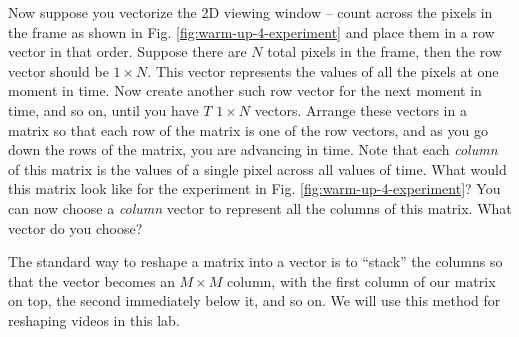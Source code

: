 Now suppose you vectorize the 2D viewing window -- count across the pixels in the frame as shown in Fig. \ref{fig:warm-up-4-experiment} and place them in a row vector in that order. Suppose there are $N$ total pixels in the frame, then the row vector should be $1 \times N$. This vector represents the values of all the pixels at one moment in time. Now create another such row vector for the next moment in time, and so on, until you have $T$ $1 \times N$ vectors. Arrange these vectors in a matrix so that each row of the matrix is one of the row vectors, and as you go down the rows of the matrix, you are advancing in time. Note that each \textit{column} of this matrix is the values of a single pixel across all values of time. What would this matrix look like for the experiment in Fig. \ref{fig:warm-up-4-experiment}? You can now choose a \textit{column} vector to represent all the columns of this matrix. What vector do you choose?

The standard way to reshape a matrix into a vector is to ``stack'' the columns so that the vector becomes an $M \times M$ column, with the first column of our matrix on top, the second immediately below it, and so on. We will use this method for reshaping videos in this lab.